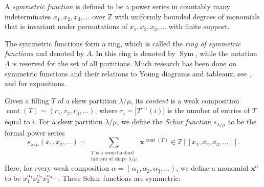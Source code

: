 \documentclass[numbers=enddot,12pt,final,onecolumn,notitlepage]{scrartcl}%
\theoremstyle{definition}
\newenvironment{todo}{}{}
\let\sumnonlimits\sum
\renewcommand{\sum}{\sumnonlimits\limits}
\def\x{{\mathbf{x}}}
\def\lm{{\lambda/\mu}}
\def\Z{{\mathbb{Z}}}
\begin{document}
\begin{comment}
The \textit{symmetric functions} over $\mathbf{k}$ are defined to be the
symmetric bounded-degree power series $f\in\mathbf{k}\left[  \left[
x_{1},x_{2},x_{3},\ldots\right]  \right]  $. They form a $\mathbf{k}%
$-subalgebra of $\mathbf{k}\left[  \left[  x_{1},x_{2},x_{3},\ldots\right]
\right]  $. This $\mathbf{k}$-subalgebra is called the \textit{ring of
symmetric functions over }$\mathbf{k}$; it will be denoted by $\Lambda$ or
(when $\mathbf{k}$ is not clear from the context) by $\Lambda_{\mathbf{k}}$.
(The reader shall be warned that \cite{LamPyl} denotes this $\mathbf{k}%
$-algebra by $\operatorname*{Sym}$, while using the notation $\Lambda$ for the
set of all partitions.) Symmetric functions are a classical
field of research, and are closely related to Young diagrams and tableaux; see
\cite[Chapter 7]{Stan99}, \cite{Macdon95} and \cite[Chapter 2]{GriRei15} for expositions.

\begin{todo}
 Decide whether we want to work over $\Z$ or over an arbitrary commutative field $\mathbf{k}$ with unity. 
\end{todo}
\end{comment}


A \textit{symmetric function} is defined to be a
power series in countably many indeterminates $x_1,x_2,x_3,\dots$ over $\Z$ with uniformly bounded degrees of monomials that is invariant under permutations of $x_1,x_2,x_3,\dots$ with finite support. 

The symmetric functions form a ring, which is called the \textit{ring of
symmetric functions} and denoted by $\Lambda$. In \cite{LamPyl} this ring is denoted by $\operatorname*{Sym}$, while the notation $\Lambda$ is reserved for the
set of all partitions. Much research has been done on symmetric functions and
their relations to Young diagrams and tableaux; see
\cite[Chapter 7]{Stan99}, \cite{Macdon95} and \cite[Chapter 2]{GriRei15} for expositions. 




 Given a filling $T$ of a skew partition $\lm$, its \textit{content} is a weak composition $\operatorname*{cont}\left(  T\right)=\left(r_1,r_2,r_3,\dots\right)$, where $r_i=\left|T^{-1}(i)\right|$ is the number of entries of $T$ equal to $i$. For a skew partition $\lambda/\mu$, we define the \textit{Schur function}
$s_{\lambda/\mu}$ to be the formal power series 
\[
s_\lm(x_1,x_2,\dots)
= \sum_{\substack{T\text{ is a semistandard}\\\text{tableau of shape } \lm}}
\mathbf{x}^{\operatorname*{cont}\left(  T\right)  }
\in \Z\left[\left[x_1,x_2,x_3,\ldots\right]\right] .
\]
Here, for every weak composition $\alpha = \left(\alpha_1, \alpha_2, \alpha_3, \ldots\right)$, we define a monomial $\x^\alpha$ to be $x_1^{\alpha_1} x_2^{\alpha_2} x_3^{\alpha_3} \cdots$.
These Schur functions are symmetric:
\end{document}
